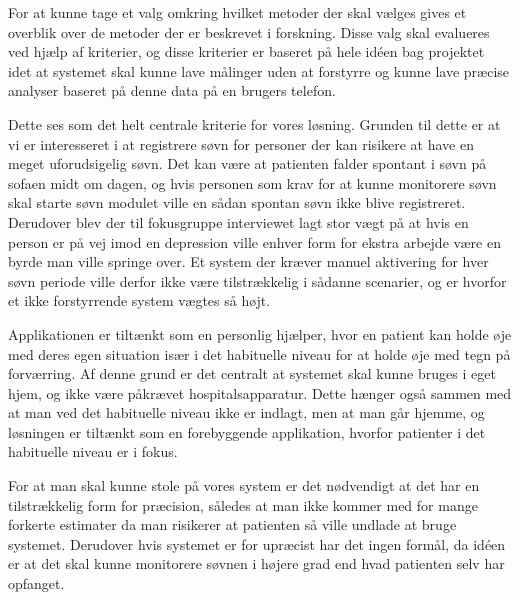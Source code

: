 For at kunne tage et valg omkring hvilket metoder der skal vælges gives et overblik over de metoder der er beskrevet i forskning.
Disse valg skal evalueres ved hjælp af kriterier, og disse kriterier er baseret på hele idéen bag projektet idet at systemet skal kunne lave målinger uden at forstyrre og kunne lave præcise analyser baseret på denne data på en brugers telefon. 

\begin{description}[style=nextline]
\item[Undgå bruger intervention og måler søvn uden at forstyrre]
Dette ses som det helt centrale kriterie for vores løsning.
Grunden til dette er at vi er interesseret i at registrere søvn for personer der kan risikere at have en meget uforudsigelig søvn. Det kan være at patienten falder spontant i søvn på sofaen midt om dagen, og hvis personen som krav for at kunne monitorere søvn skal starte søvn modulet ville en sådan spontan søvn ikke blive registreret.
Derudover blev der til fokusgruppe interviewet \citep[Kapitel 1, Sektion 5]{misc:faellesrapp} lagt stor vægt på at hvis en person er på vej imod en depression ville enhver form for ekstra arbejde være en byrde man ville springe over.
Et system der kræver manuel aktivering for hver søvn periode ville derfor ikke være tilstrækkelig i sådanne scenarier, og er hvorfor et ikke forstyrrende system vægtes så højt.

\item[Kunne bruges af brugere i deres eget hjem]
Applikationen er tiltænkt som en personlig hjælper, hvor en patient kan holde øje med deres egen situation især i det habituelle niveau for at holde øje med tegn på forværring.
Af denne grund er det centralt at systemet skal kunne bruges i eget hjem, og ikke være påkrævet hospitalsapparatur.
Dette hænger også sammen med at man ved det habituelle niveau ikke er indlagt, men at man går hjemme, og løsningen er tiltænkt som en forebyggende applikation, hvorfor patienter i det habituelle niveau er i fokus.

\item[Være præcis og hvis den kan måle søvnforstyrrelser er dette en fordel]
For at man skal kunne stole på vores system er det nødvendigt at det har en tilstrækkelig form for præcision, således at man ikke kommer med for mange forkerte estimater da man risikerer at patienten så ville undlade at bruge systemet. 
Derudover hvis systemet er for upræcist har det ingen formål, da idéen er at det skal kunne monitorere søvnen i højere grad end hvad patienten selv har opfanget.
\end{description}

